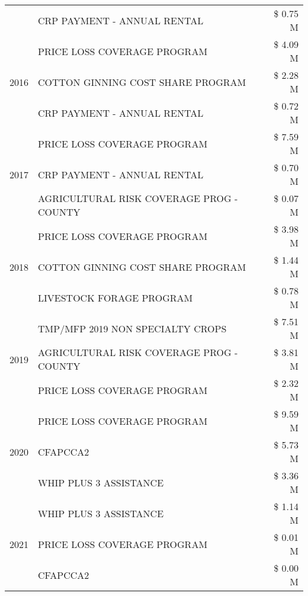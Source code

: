 \begin{tabular}{llr}
 & CRP PAYMENT - ANNUAL RENTAL & \$ 0.75 M \\
\cline{1-3}
\multirow[t]{3}{*}{2016} & PRICE LOSS COVERAGE PROGRAM & \$ 4.09 M \\
 & COTTON GINNING COST SHARE PROGRAM & \$ 2.28 M \\
 & CRP PAYMENT - ANNUAL RENTAL & \$ 0.72 M \\
\cline{1-3}
\multirow[t]{3}{*}{2017} & PRICE LOSS COVERAGE PROGRAM & \$ 7.59 M \\
 & CRP PAYMENT - ANNUAL RENTAL & \$ 0.70 M \\
 & AGRICULTURAL RISK COVERAGE PROG - COUNTY & \$ 0.07 M \\
\cline{1-3}
\multirow[t]{3}{*}{2018} & PRICE LOSS COVERAGE PROGRAM & \$ 3.98 M \\
 & COTTON GINNING COST SHARE PROGRAM & \$ 1.44 M \\
 & LIVESTOCK FORAGE PROGRAM & \$ 0.78 M \\
\cline{1-3}
\multirow[t]{3}{*}{2019} & TMP/MFP 2019 NON SPECIALTY CROPS & \$ 7.51 M \\
 & AGRICULTURAL RISK COVERAGE PROG - COUNTY & \$ 3.81 M \\
 & PRICE LOSS COVERAGE PROGRAM & \$ 2.32 M \\
\cline{1-3}
\multirow[t]{3}{*}{2020} & PRICE LOSS COVERAGE PROGRAM & \$ 9.59 M \\
 & CFAPCCA2 & \$ 5.73 M \\
 & WHIP PLUS 3 ASSISTANCE & \$ 3.36 M \\
\cline{1-3}
\multirow[t]{3}{*}{2021} & WHIP PLUS 3 ASSISTANCE & \$ 1.14 M \\
 & PRICE LOSS COVERAGE PROGRAM & \$ 0.01 M \\
 & CFAPCCA2 & \$ 0.00 M \\
\cline{1-3}
\bottomrule
\end{tabular}
